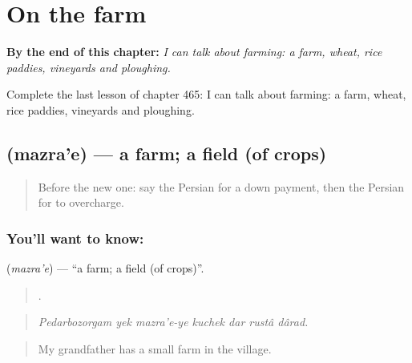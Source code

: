 
\chapter{On the farm}
\label{ch:fa-on-the-farm}

\begin{chapteropening}
\textbf{By the end of this chapter:} \emph{I can talk about farming: a farm, wheat, rice paddies, vineyards and ploughing.}

Complete the last lesson of chapter 465: I can talk about farming: a farm, wheat, rice paddies, vineyards and ploughing.
\end{chapteropening}

\section[\texorpdfstring{\fa{مزرعه} (mazra'e)}{مزرعه (mazra'e)}]{ (mazra'e) — a farm; a field (of crops)}

\label{lesson:FA-C465-mazrae}



\begin{quote}
Before the new one: say the Persian for a down payment, then the Persian for to overcharge.
\end{quote}

\subsection*{You'll want to know: }
\textbf{} (\emph{mazra'e}) — \textquotedblleft{}a farm; a field (of crops)\textquotedblright{}.

\begin{quote}
      .
\end{quote}

\begin{quote}
\emph{Pedarbozorgam yek mazra'e-ye kuchek dar rustâ dârad.}
\end{quote}

\begin{quote}
My grandfather has a small farm in the village.
\end{quote}

